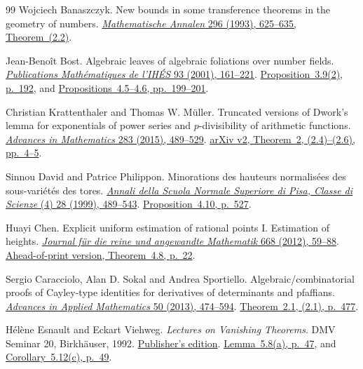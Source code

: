 \begin{thebibliography}{99}
Wojciech Banaszczyk.
New bounds in some transference theorems in the geometry of numbers.
\href{https://doi.org/10.1007/BF01445125}
{\emph{Mathematische Annalen} 296 (1993), 625--635, Theorem~(2.2)}.

Jean-Beno\^it Bost.
Algebraic leaves of algebraic foliations over number fields.
\href{https://doi.org/10.1007/s10240-001-8191-3}
{\emph{Publications Math\'ematiques de l'IH\'ES} 93 (2001), 161--221}.
\href{https://www.numdam.org/item/PMIHES_2001__93__161_0.pdf\#page=32}
{Proposition~3.9(2), p.~192}, and
\href{https://www.numdam.org/item/PMIHES_2001__93__161_0.pdf\#page=39}
{Propositions~4.5--4.6, pp.~199--201}.

Christian Krattenthaler and Thomas W. M\"uller.
Truncated versions of Dwork's lemma for exponentials of power series
and \(p\)-divisibility of arithmetic functions.
\href{https://doi.org/10.1016/j.aim.2015.05.018}
{\emph{Advances in Mathematics} 283 (2015), 489--529}.
\href{https://arxiv.org/pdf/1412.7014v2\#page=4}
{arXiv v2, Theorem~2, (2.4)--(2.6), pp.~4--5}.

Sinnou David and Patrice Philippon.
Minorations des hauteurs normalis\'ees des sous-vari\'et\'es des tores.
\href{https://www.numdam.org/item/ASNSP_1999_4_28_3_489_0/}
{\emph{Annali della Scuola Normale Superiore di Pisa, Classe di Scienze}
(4) 28 (1999), 489--543}.
\href{https://www.numdam.org/item/ASNSP_1999_4_28_3_489_0.pdf\#page=40}
{Proposition~4.10, p.~527}.

Huayi Chen.
Explicit uniform estimation of rational points I. Estimation of heights.
\href{https://doi.org/10.1515/CRELLE.2011.138}
{\emph{Journal f\"ur die reine und angewandte Mathematik} 668 (2012),
59--88}.
\href{https://webusers.imj-prg.fr/~huayi.chen/Recherche/effunifI.pdf\#page=22}
{Ahead-of-print version, Theorem~4.8, p.~22}.

Sergio Caracciolo, Alan D. Sokal and Andrea Sportiello.
Algebraic/combinatorial proofs of Cayley-type identities for derivatives
of determinants and pfaffians.
\href{https://doi.org/10.1016/j.aam.2012.12.001}
{\emph{Advances in Applied Mathematics} 50 (2013), 474--594}.
\href{https://discovery.ucl.ac.uk/id/eprint/10101899/1/Sokal_1-s2.0-S0196885812001315-main.pdf\#page=4}
{Theorem~2.1, (2.1), p.~477}.

H\'el\`ene Esnault and Eckart Viehweg.
\emph{Lectures on Vanishing Theorems}.
DMV Seminar 20, Birkh\"auser, 1992.
\href{https://doi.org/10.1007/978-3-0348-8600-0}{Publisher's edition}.
\href{https://page.mi.fu-berlin.de/esnault/books/esvibuch.pdf\#page=50}
{Lemma~5.8(a), p.~47}, and
\href{https://page.mi.fu-berlin.de/esnault/books/esvibuch.pdf\#page=52}
{Corollary~5.12(c), p.~49}.


\end{thebibliography}

